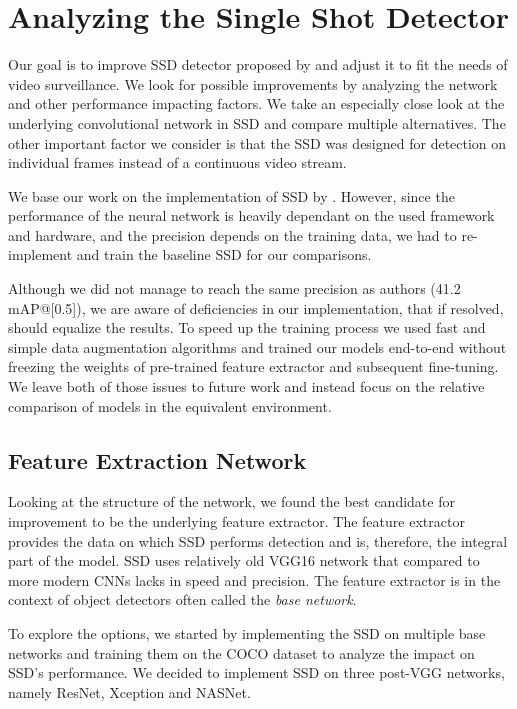 \chapter{Analyzing the Single Shot Detector}
\label{chap:contrib}

Our goal is to improve SSD detector proposed by \citeauthor{bib:ssd} and adjust it to fit the needs of video surveillance. We look for possible improvements by analyzing the network and other performance impacting factors. We take an especially close look at the underlying convolutional network in SSD and compare multiple alternatives. The other important factor we consider is that the SSD was designed for detection on individual frames instead of a continuous video stream.

We base our work on the implementation of SSD by \citeauthor{bib:ssd}. However, since the performance of the neural network is heavily dependant on the used framework and hardware, and the precision depends on the training data, we had to re-implement and train the baseline SSD for our comparisons.

Although we did not manage to reach the same precision as authors (41.2 mAP@[0.5]), we are aware of deficiencies in our implementation, that if resolved, should equalize the results. To speed up the training process we used fast and simple data augmentation algorithms and trained our models end-to-end without freezing the weights of pre-trained feature extractor and subsequent fine-tuning. We leave both of those issues to future work and instead focus on the relative comparison of models in the equivalent environment.

\section{Feature Extraction Network}
\label{sec:base}
Looking at the structure of the network, we found the best candidate for improvement to be the underlying feature extractor. The feature extractor provides the data on which SSD performs detection and is, therefore, the integral part of the model. SSD uses relatively old VGG16 network that compared to more modern CNNs lacks in speed and precision.  The feature extractor is in the context of object detectors often called the \textit{base network}.

To explore the options, we started by implementing the SSD on multiple base networks and training them on the COCO dataset to analyze the impact on SSD's performance. We decided to implement SSD on three post-VGG networks, namely ResNet, Xception and NASNet. 

